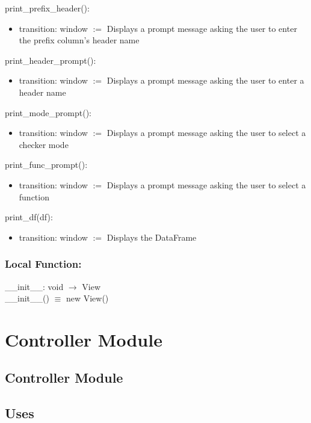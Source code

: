 \documentclass[12pt]{article}
\begin{document}
\noindent print\_prefix\_header():
\begin{itemize}
\item transition: window $:=$ Displays a prompt message asking the user to enter the prefix column's header name
\end{itemize}

\noindent print\_header\_prompt():
\begin{itemize}
\item transition: window $:=$ Displays a prompt message asking the user to enter a header name
\end{itemize}

\noindent print\_mode\_prompt():
\begin{itemize}
\item transition: window $:=$ Displays a prompt message asking the user to select a checker mode
\end{itemize}

\noindent print\_func\_prompt():
\begin{itemize}
\item transition: window $:=$ Displays a prompt message asking the user to select a function
\end{itemize}

\noindent print\_df(df):
\begin{itemize}
\item transition: window $:=$ Displays the DataFrame
\end{itemize}

\subsubsection*{Local Function:}

\_\_init\_\_: void $\rightarrow$ View \\
\_\_init\_\_() $\equiv$ new View()

\newpage

\section* {Controller Module}

\subsection* {Controller Module}

\subsection* {Uses}
\end{document}
